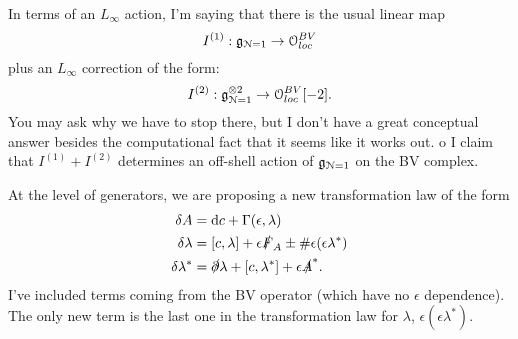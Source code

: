 \documentclass[10pt, oneside]{article}
\renewcommand{\d}{\mathrm{d}}
\begin{document}
In terms of an $L_\infty$ action, I'm saying that there is the usual linear map
\[
I^{(1)} : \mathfrak{g}_{\mathcal{N}=1} \to \mathcal{O}_{loc}^{BV} 
\]
plus an $L_\infty$ correction of the form:
\[
I^{(2)} : \mathfrak{g}_{\mathcal{N}=1}^{\otimes 2} \to \mathcal{O}_{loc}^{BV} [-2]  .
\]
You may ask why we have to stop there, but I don't have a great conceptual answer besides the computational fact that it seems like it works out. o
I claim that $I^{(1)} + I^{(2)}$ determines an off-shell action of $\mathfrak{g}_{\mathcal{N}=1}$ on the BV complex. 

At the level of generators, we are proposing a new transformation law of the form 
\begin{align*}
\delta A &= \d c + \Gamma(\epsilon,\lambda) \\
\delta \lambda &= [c,\lambda] + \epsilon \sd F_A  \pm \# \epsilon (\epsilon \lambda^*)  \\
\delta \lambda^* &= \sd \partial \lambda + [c, \lambda^*] + \epsilon \sd A^*  .
\end{align*}
I've included terms coming from the BV operator (which have no $\epsilon$ dependence). 
The only new term is the last one in the transformation law for $\lambda$, $\epsilon (\epsilon \lambda^*)$. 
\end{document}
